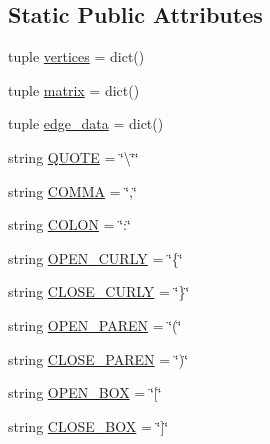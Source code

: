\subsection*{Static Public Attributes}
\begin{DoxyCompactItemize}
\item 
tuple \hyperlink{class_graph_adj_matrix_1_1_graph_adj_matrix_ab02c8991e3ec38d4f1d277b350fbce4f}{vertices} = dict()
\item 
tuple \hyperlink{class_graph_adj_matrix_1_1_graph_adj_matrix_a91aa7f16814c76e4c2b9f80dd069012c}{matrix} = dict()
\item 
tuple \hyperlink{class_graph_adj_matrix_1_1_graph_adj_matrix_a35da735f2c96de37164a8d1fc5685169}{edge\+\_\+data} = dict()
\item 
string \hyperlink{class_graph_adj_matrix_1_1_graph_adj_matrix_acd4760c3ebf6789b9f8b1ec13d5394ee}{Q\+U\+O\+T\+E} = \char`\"{}\textbackslash{}\char`\"{}\char`\"{}
\item 
string \hyperlink{class_graph_adj_matrix_1_1_graph_adj_matrix_af89add5b46ddd03667112f09864c254e}{C\+O\+M\+M\+A} = \char`\"{},\char`\"{}
\item 
string \hyperlink{class_graph_adj_matrix_1_1_graph_adj_matrix_a2609bedf192ae86ea8e23b485e7b47ae}{C\+O\+L\+O\+N} = \char`\"{}\+:\char`\"{}
\item 
string \hyperlink{class_graph_adj_matrix_1_1_graph_adj_matrix_a38221ef750dc8928ce640edc82345ecb}{O\+P\+E\+N\+\_\+\+C\+U\+R\+L\+Y} = \char`\"{}\{\char`\"{}
\item 
string \hyperlink{class_graph_adj_matrix_1_1_graph_adj_matrix_a89e0ee6c90313064d0640bf4224bf176}{C\+L\+O\+S\+E\+\_\+\+C\+U\+R\+L\+Y} = \char`\"{}\}\char`\"{}
\item 
string \hyperlink{class_graph_adj_matrix_1_1_graph_adj_matrix_a0eb8509351b0db9469c5fffe5eddb898}{O\+P\+E\+N\+\_\+\+P\+A\+R\+E\+N} = \char`\"{}(\char`\"{}
\item 
string \hyperlink{class_graph_adj_matrix_1_1_graph_adj_matrix_a5a4c67a2a5a834bdf1a3dea9c9d9af7a}{C\+L\+O\+S\+E\+\_\+\+P\+A\+R\+E\+N} = \char`\"{})\char`\"{}
\item 
string \hyperlink{class_graph_adj_matrix_1_1_graph_adj_matrix_aa5c52ba4ecf6ae108cc91a4cf864d8d9}{O\+P\+E\+N\+\_\+\+B\+O\+X} = \char`\"{}\mbox{[}\char`\"{}
\item 
string \hyperlink{class_graph_adj_matrix_1_1_graph_adj_matrix_a5a719d18af560718e529b30182936512}{C\+L\+O\+S\+E\+\_\+\+B\+O\+X} = \char`\"{}\mbox{]}\char`\"{}
\end{DoxyCompactItemize}


